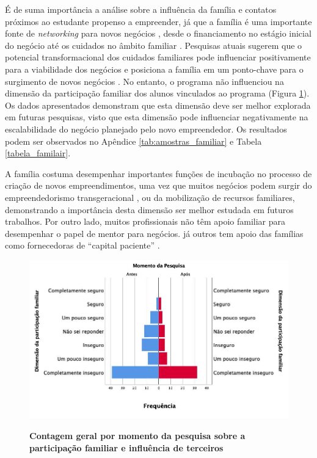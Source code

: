 É de suma importância a análise sobre a influência da família e contatos próximos ao estudante propenso a empreender, já que a família é uma importante fonte de \textit{networking} para novos negócios \cite{soto_does_2019,raza_influence_2019,kupp_when_2019}, desde o financiamento no estágio inicial do negócio \cite{soto_does_2019,edelman_impact_2016} até os cuidados no âmbito familiar \cite{meliou_family_2020}  \cite{puzi_transgenerational_2020}. Pesquisas atuais sugerem que o potencial transformacional dos cuidados familiares pode influenciar positivamente para a viabilidade dos negócios e posiciona a família em um ponto-chave para o surgimento de novos negócios \cite{georgescu_impact_2020,jena_measuring_2020,porfirio_family_2020}. No entanto, o programa não influenciou na dimensão da participação familiar dos alunos vinculados ao programa (Figura \ref{figura_60}). Os dados apresentados demonstram que esta dimensão deve ser melhor explorada em futuras pesquisas, visto que esta dimensão pode influenciar negativamente na escalabilidade do negócio planejado pelo novo empreendedor. Os resultados podem ser observados no Apêndice \ref{tab:amostras_familiar} e Tabela \ref{tabela_familair}.


A família costuma desempenhar importantes funções de incubação no processo de criação de novos empreendimentos, uma vez que muitos negócios podem surgir do empreendedorismo transgeracional \cite{puzi_transgenerational_2020,meliou_family_2020}, ou da mobilização de recursos familiares, demonstrando a importância desta dimensão ser melhor estudada em futuros trabalhos. Por outro lado, muitos profissionais não têm apoio familiar para desempenhar o papel de mentor para negócios. já outros tem apoio das famílias como fornecedoras de “capital paciente” \cite{lumpkin_longterm_2011}.


\begin{figure}[H]
\centering
\caption{\textbf{Contagem geral por momento da pesquisa sobre a participação familiar e influência de terceiros}}
\includegraphics[scale=0.4]{Imagens/dimensao_familiar.jpg}
\label{figura_60}
\end{figure}


